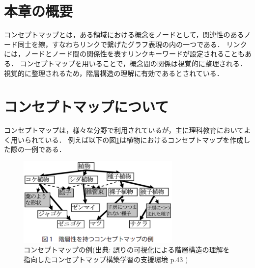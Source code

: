 \section{本章の概要}
コンセプトマップ\cite{concept}とは，ある領域における概念をノードとして，関連性のあるノード同士を線，すなわちリンクで繋げたグラフ表現の内の一つである．
リンクには，ノードとノード間の関係性を表すリンクキーワードが設定されることもある．
コンセプトマップを用いることで，概念間の関係は視覚的に整理される．
視覚的に整理されるため，階層構造の理解に有効であるとされている．

\section{コンセプトマップについて}
コンセプトマップは，様々な分野で利用されているが，主に理科教育においてよく用いられている\cite{yama}\cite{saito}．
例えば以下の図\ref{fig:example_concept}は植物におけるコンセプトマップを作成した際の一例である．

\begin{figure}[htbp]
\begin{center}
\includegraphics[width=8cm]{img/example_concept.eps}
\end{center}
\caption{コンセプトマップの例(出典: 誤りの可視化による階層構造の理解を指向したコンセプトマップ構築学習の支援環境 p.43 \cite{toumoto})}
\label{fig:example_concept}
\end{figure}